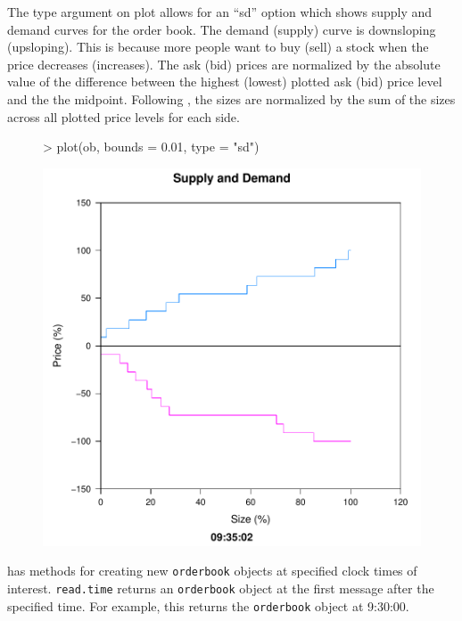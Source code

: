 The type argument on plot allows for an ``sd'' option which shows
supply and demand curves for the order book. The demand (supply) curve
is downsloping (upsloping). This is because more people want to buy
(sell) a stock when the price decreases (increases). The ask (bid)
prices are normalized by the absolute value of the difference between
the highest (lowest) plotted ask (bid) price level and the the
midpoint. Following \cite{cao:orderbook}, the sizes are normalized by
the sum of the sizes across all plotted price levels for each
side.

\begin{figure}
  \centering
  \vspace*{.1in}
\begin{Schunk}
\begin{Sinput}
> plot(ob, bounds = 0.01, type = "sd")
\end{Sinput}
\end{Schunk}
\includegraphics[scale = 0.5]{orderbook-009}
\end{figure}

 has methods for creating new \texttt{orderbook}
objects at specified clock times of interest. \texttt{read.time}
returns an \texttt{orderbook} object at the first message after the
specified time. For example, this returns the \texttt{orderbook}
object at 9:30:00.


